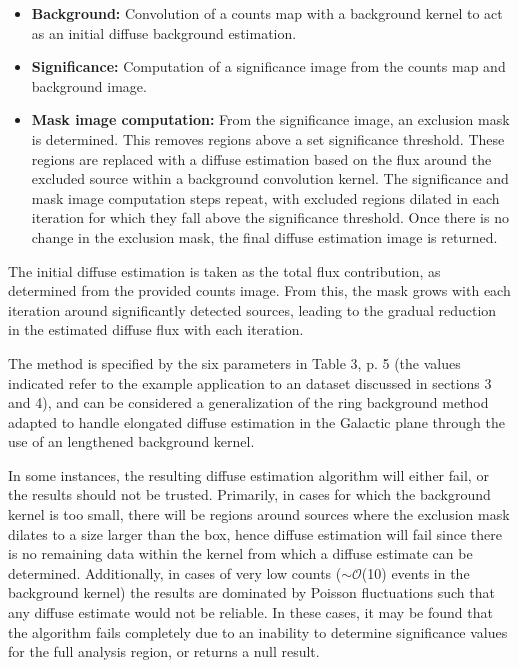 \documentclass{PoS}
\begin{document}
\begin{itemize}[noitemsep,nolistsep]
\item \textbf{Background:} Convolution of a counts map with a background kernel to act as an initial diffuse background estimation.
\item \textbf{Significance:} Computation of a significance image from the counts map and background image.
\item \textbf{Mask image computation:} From the significance image, an exclusion mask is determined. This removes regions above a set significance threshold. These regions are replaced with a diffuse estimation based on the flux around the excluded source within a background convolution kernel. The significance and mask image computation steps repeat, with excluded regions dilated in each iteration for which they fall above the significance threshold. Once there is no change in the exclusion mask, the final diffuse estimation image is returned.
\end{itemize}

The initial diffuse estimation is taken as the total flux contribution, as determined from the provided counts image. From this, the mask grows with each iteration around significantly detected sources, leading to the gradual reduction in the estimated diffuse flux with each iteration.

The method is specified by the six parameters in Table 3, p. 5 (the values indicated refer to the example application to an dataset discussed in sections 3 and 4), and can be considered a generalization of the ring background method \cite{berge} adapted to handle elongated diffuse estimation in the Galactic plane through the use of an lengthened background kernel.

In some instances, the resulting diffuse estimation algorithm will either fail, or the results should not be trusted. Primarily, in cases for which the background kernel is too small, there will be regions around sources where the exclusion mask dilates to a size larger than the box, hence diffuse estimation will fail since there is no remaining data within the kernel from which a diffuse estimate can be determined. Additionally, in cases of very low counts (\textbf{$\sim\mathcal{O}$}(10) events in the background kernel) the results are dominated by Poisson fluctuations such that any diffuse estimate would not be reliable. In these cases, it may be found that the algorithm fails completely due to an inability to determine significance values for the full analysis region, or returns a null result.
\end{document}
